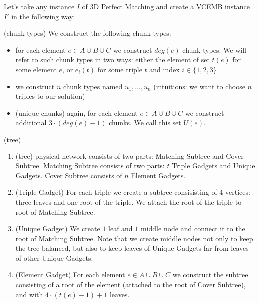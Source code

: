 \documentclass[conference,10pt]{IEEEtran}
\begin{document}
Let's take any instance $I$ of 3D Perfect Matching and create a VCEMB
instance $I'$ in the following way:

(chunk types) We construct the following chunk types:
\begin{itemize}
\item for each element $e\in A\cup B\cup C$ we construct $deg(e)$
  chunk types. We will refer to such chunk types in two ways: either
  the element of set $t(e)$ for some element $e$, or $e_i(t)$ for some
  triple $t$ and index $i \in \{1,2,3\}$
\item we construct $n$ chunk types named $u_1, \ldots, u_n$ (intuitions: we want to choose $n$ triples to our solution)
\item (unique chunks) again, for each element $e\in A\cup B\cup C$ we construct additional $3\cdot(deg(e) - 1)$ chunks. We call this set $U(e)$.
\end{itemize}

(tree) 

\begin{enumerate}
\item (tree) physical network consists of two parts: Matching Subtree
  and Cover Subtree. Matching Subtree consists of two parts: $t$
  Triple Gadgets and Unique Gadgets. Cover Subtree consists of
  $n$ Element Gadgets.
\item (Triple Gadget) For each triple we create a subtree
  consisisting of 4 vertices: three leaves and one root of the
  triple. We attach the root of the triple to root of Matching
  Subtree.
\item (Unique Gadget) We create $1$ leaf and $1$ middle node and
  connect it to the root of Matching Subtree. Note that we create middle
  nodes not only to keep the tree balanced, but also to keep leaves of
  Unique Gadgets far from leaves of other Unique Gadgets.
\item (Element Gadget) For each element $e \in A\cup B\cup C$ we
  construct the subtree consisting of a root of the element (attached
  to the root of Cover Subtree), and with $4\cdot(t(e)-1)+1$
  leaves.

\end{enumerate}
\end{document}
